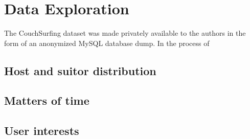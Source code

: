 \section{Data Exploration}

The CouchSurfing dataset was made privately available to the authors in the form of an anonymized MySQL database dump.
In the process of   

\subsection{Host and suitor distribution}

\subsection{Matters of time}

\subsection{User interests}